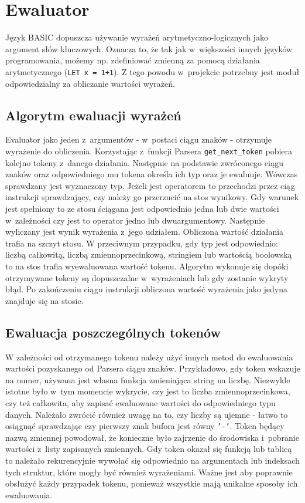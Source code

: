\documentclass[shortabstract]{iithesis}
\begin{document}
\section{Ewaluator}
Język BASIC dopuszcza używanie wyrażeń arytmetyczno-logicznych jako argument słów kluczowych. Oznacza to, że tak jak w~większości innych języków programowania, możemy np. zdefiniować zmienną za pomocą działania arytmetycznego (\texttt{LET x = 1+1}). Z tego powodu w~projekcie potrzebny jest moduł odpowiedzialny za obliczanie wartości wyrażeń.
\subsection{Algorytm ewaluacji wyrażeń}
Evaluator jako jeden z~argumentów - w~postaci ciągu znaków - otrzymuje wyrażenie do obliczenia. Korzystając z~funkcji Parsera \texttt{get\_next\_token} pobiera kolejno tokeny z~danego działania. Następnie na podstawie zwróconego ciągu znaków oraz odpowiedniego mu tokena określa ich typ oraz je ewaluuje. Wówczas sprawdzany jest wyznaczony typ. Jeżeli jest operatorem to przechodzi przez ciąg instrukcji sprawdzający, czy należy go przerzucić na stos wynikowy. Gdy warunek jest spełniony to ze stosu ściągana jest odpowiednio jedna lub dwie wartości w~zależności czy jest to operator jedno lub dwuargumentowy. Następnie wyliczany jest wynik wyrażenia z~jego udziałem. Obliczona wartość działania trafia na szczyt stosu. W przeciwnym przypadku, gdy typ jest odpowiednio: liczbą całkowitą, liczbą zmiennoprzecinkową, stringiem lub wartością boolowską to na stos trafia wyewaluowana wartość tokenu. Algorytm wykonuje się dopóki otrzymywane tokeny są dopuszczalne w~wyrażeniach lub gdy zostanie wykryty błąd. Po zakończeniu ciągu instrukcji obliczona wartość wyrażenia jako jedyna znajduje się na stosie.
\subsection{Ewaluacja poszczególnych tokenów}
W zależności od otrzymanego tokenu należy użyć innych metod do ewaluowania wartości pozyskanego od Parsera ciągu znaków. Przykładowo, gdy token wskazuje na numer, używana jest własna funkcja zmieniająca string na liczbę. Niezwykle istotne było w~tym momencie wykrycie, czy jest to liczba zmiennoprzecinkowa, czy też całkowita, aby zapisać ewaluowane wartości do odpowiedniego typu danych. Należało zwrócić również uwagę na to, czy liczby są ujemne - łatwo to osiągnąć sprawdzając czy pierwszy znak bufora jest równy \texttt{'-'}. Token będący nazwą zmiennej powodował, że konieczne było zajrzenie do środowiska i~pobranie wartości z~listy zapisanych zmiennych. Gdy token okazał się funkcją lub tablicą to należało rekurencyjnie wywołać się odpowiednio na argumentach lub indeksach tych struktur, które mogły być również wyrażeniami. Ważne jest aby poprawnie obsłużyć każdy przypadek tokenu, ponieważ wszystkie mają unikalne sposoby ich ewaluowania.
\end{document}
